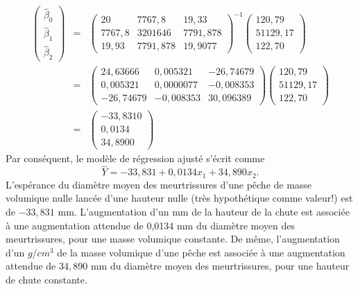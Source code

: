 \begin{eqnarray*}
\left(
\begin{array}{c}
\hat\beta_0 \\
\hat\beta_1 \\
\hat\beta_2
\end{array}
\right)
& = &
\left(
\begin{array}{ccc}
20 & 7767,8 & 19,33 \\
7767,8 & 3201646 & 7791,878 \\
19,93 & 7791,878 & 19,9077
\end{array}
\right)^{-1}
\left(
\begin{array}{r}
120,79 \\
51129,17 \\
122,70
\end{array}
\right) \\
& = &
\left(
\begin{array}{rrr}
24,63666 & 0,005321 & -26,74679 \\
0,005321 & 0,0000077 & -0,008353 \\
-26,74679 & -0,008353 & 30,096389
\end{array}
\right)
\left(
\begin{array}{r}
120,79 \\
51129,17 \\
122,70
\end{array}
\right) \\
& = &
\left(
\begin{array}{r}
-33,8310 \\
0,0134 \\
34,8900
\end{array}
\right)
\end{eqnarray*}
Par conséquent, le modèle de régression ajusté s'écrit comme
$$\hat Y=-33,831+0,0134x_1+34,890x_2.$$
L'espérance du diamètre moyen des meurtrissures d'une pêche de masse volumique nulle lancée d'une hauteur nulle (très hypothétique comme valeur!) est de $-33,831$ mm. L'augmentation d'un mm de la hauteur de la chute est associée à une augmentation attendue de 0,0134 mm du diamètre moyen des meurtrissures, pour une masse volumique constante. De même, l'augmentation d'un $g/cm^3$ de la masse volumique d'une pêche est associée à une augmentation attendue de $34,890$ mm du diamètre moyen des meurtrissures, pour une hauteur de chute constante.


